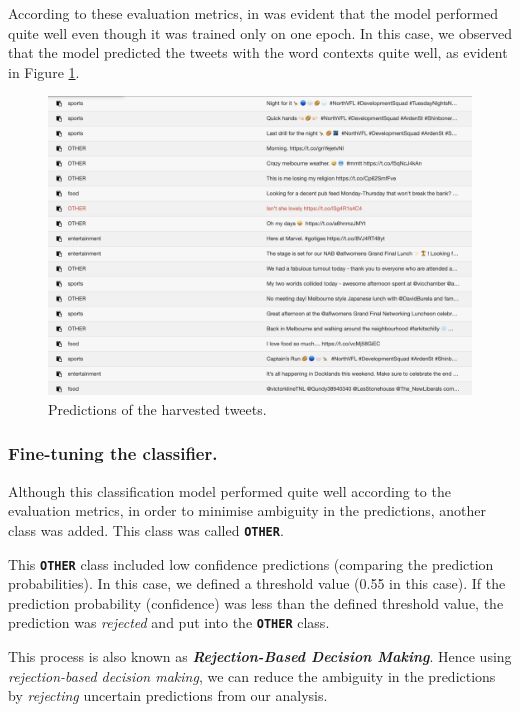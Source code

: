 \documentclass[parskip=full, 11pt]{article}
\begin{document}
According to these evaluation metrics, in was evident that the model performed quite well even though it was trained only on one epoch. In this case, we observed that the model predicted the tweets with the word contexts quite well, as evident in Figure \ref{fig:tweet_preds}.

\begin{figure}[H]
    \centering
    \includegraphics[width=1\textwidth]{Figures/Harvested_Tweet_Predictions.png}
    \caption{Predictions of the harvested tweets.}
    \label{fig:tweet_preds}
\end{figure}

\subsubsection{Fine-tuning the classifier.}

Although this classification model performed quite well according to the evaluation metrics, in order to minimise ambiguity in the predictions, another class was added. This class was called \textbf{\texttt{OTHER}}. 

This \textbf{\texttt{OTHER}} class included low confidence predictions (comparing the prediction probabilities). In this case, we defined a threshold value (0.55 in this case). If the prediction probability (confidence) was less than the defined threshold value, the prediction was \emph{rejected} and put into the \textbf{\texttt{OTHER}} class. 

This process is also known as \textbf{\emph{Rejection-Based Decision Making}}. Hence using \emph{rejection-based decision making}, we can reduce the ambiguity in the predictions by \emph{rejecting} uncertain predictions from our analysis.
\end{document}

